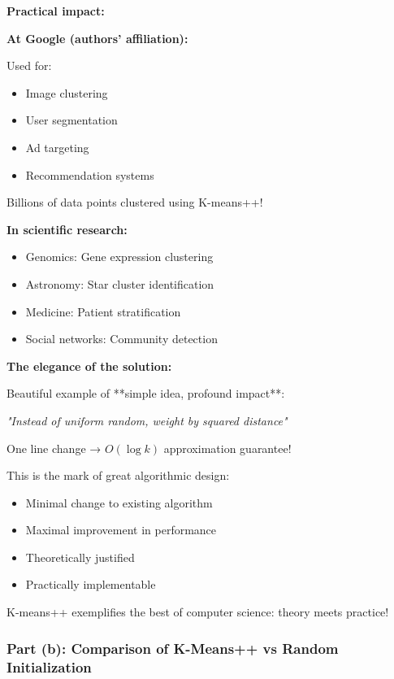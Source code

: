 \documentclass[12pt]{article}
\begin{document}
\begin{explanation}
\textbf{Practical impact:}

\textbf{At Google (authors' affiliation):}

Used for:
\begin{itemize}
    \item Image clustering
    \item User segmentation
    \item Ad targeting
    \item Recommendation systems
\end{itemize}

Billions of data points clustered using K-means++!

\textbf{In scientific research:}

\begin{itemize}
    \item Genomics: Gene expression clustering
    \item Astronomy: Star cluster identification
    \item Medicine: Patient stratification
    \item Social networks: Community detection
\end{itemize}

\textbf{The elegance of the solution:}

Beautiful example of **simple idea, profound impact**:

\begin{center}
\textit{"Instead of uniform random, weight by squared distance"}
\end{center}

One line change → $O(\log k)$ approximation guarantee!

This is the mark of great algorithmic design:
\begin{itemize}
    \item Minimal change to existing algorithm
    \item Maximal improvement in performance
    \item Theoretically justified
    \item Practically implementable
\end{itemize}

K-means++ exemplifies the best of computer science: theory meets practice!

\end{explanation}

\subsubsection{Part (b): Comparison of K-Means++ vs Random Initialization}
\end{document}
